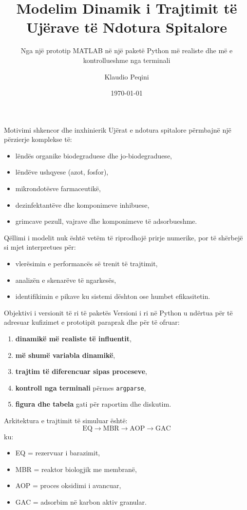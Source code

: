 \documentclass[aspectratio=169]{beamer}
\title{Modelim Dinamik i Trajtimit të Ujërave të Ndotura Spitalore}
\subtitle{Nga një prototip MATLAB në një paketë Python më realiste dhe më e kontrollueshme nga terminali}
\author{Klaudio Peqini}
\institute{Material prezantues për diskutim teknik me profesorin}
\date{\today}
\newcommand{\code}[1]{\texttt{#1}}
\begin{document}
\begin{frame}
  \titlepage
\end{frame}

\begin{frame}{Motivimi shkencor dhe inxhinierik}
\justifying
Ujërat e ndotura spitalore përmbajnë një përzierje komplekse të:
\begin{itemize}
    \item lëndës organike biodegraduese dhe jo-biodegraduese,
    \item lëndëve ushqyese (azot, fosfor),
    \item mikrondotësve farmaceutikë,
    \item dezinfektantëve dhe komponimeve inhibuese,
    \item grimcave pezull, vajrave dhe komponimeve të adsorbueshme.
\end{itemize}
Qëllimi i modelit nuk është vetëm të riprodhojë prirje numerike, por të shërbejë si \alert{mjet interpretues} për:
\begin{itemize}
    \item vlerësimin e performancës së trenit të trajtimit,
    \item analizën e skenarëve të ngarkesës,
    \item identifikimin e pikave ku sistemi dështon ose humbet efikasitetin.
\end{itemize}
\end{frame}

\begin{frame}{Objektivi i versionit të ri të paketës}
\justifying
Versioni i ri në Python u ndërtua për të adresuar kufizimet e prototipit paraprak dhe për të ofruar:
\begin{enumerate}
    \item \textbf{dinamikë më realiste të influentit},
    \item \textbf{më shumë variabla dinamikë},
    \item \textbf{trajtim të diferencuar sipas proceseve},
    \item \textbf{kontroll nga terminali} përmes \code{argparse},
    \item \textbf{figura dhe tabela} gati për raportim dhe diskutim.
\end{enumerate}
Arkitektura e trajtimit të simuluar është:
\[
\mathrm{EQ} \rightarrow \mathrm{MBR} \rightarrow \mathrm{AOP} \rightarrow \mathrm{GAC}
\]
ku:
\begin{itemize}
    \item EQ = rezervuar i barazimit,
    \item MBR = reaktor biologjik me membranë,
    \item AOP = proces oksidimi i avancuar,
    \item GAC = adsorbim në karbon aktiv granular.
\end{itemize}
\end{frame}
\end{document}
